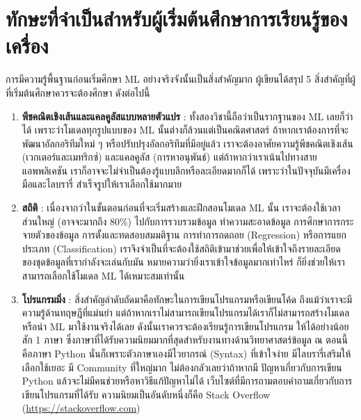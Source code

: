 \section{ทักษะที่จำเป็นสำหรับผู้เริ่มต้นศึกษาการเรียนรู้ของเครื่อง}
\label{sec:skills_for_ml}

การมีความรู้พื้นฐานก่อนเริ่มศึกษา ML อย่างจริงจังนั้นเป็นสิ่งสำคัญมาก ผู้เขียนได้สรุป 5 สิ่งสำคัญที่ผู้ที่เริ่มต้นศึกษาควรจะต้องศึกษา ดังต่อไปนี้

\begin{enumerate}
    \item \textbf{พีชคณิตเชิงเส้นและแคลคูลัสแบบหลายตัวแปร} : ทั้งสองวิชานี้ถือว่าเป็นรากฐานของ ML เลยก็ว่าได้ 
    เพราะว่าโมเดลทุกรูปแบบของ ML นั้นต่างก็ล้วนแต่เป็นคณิตศาสตร์ ถ้าหากเราต้องการที่จะพัฒนาอัลกอริทึมใหม่ ๆ 
    หรือปรับปรุงอัลกอริทึมที่มีอยู่แล้ว เราจะต้องอาศัยความรู้พีชคณิตเชิงเส้น (เวกเตอร์และเมทริกซ์) และแคลคูลัส (การหาอนุพันธ์) 
    แต่ถ้าหากว่าเราเน้นไปทางสายแอพพลิเคชัน เราก็อาจจะไม่จำเป็นต้องรู้แบบลึกหรือละเอียดมากก็ได้ เพราะว่าในปัจจุบันมีเครื่องมือและไลบรารี่%
    สำเร็จรูปให้เราเลือกใช้มากมาย
    
    \item \textbf{สถิติ} : เนื่องจากว่าในขั้นตอนก่อนที่จะเริ่มสร้างและฝึกสอนโมเดล ML นั้น เราจะต้องใช้เวลาส่วนใหญ่ 
    (อาจจะมากถึง 80\%) ไปกับการรวบรวมข้อมูล ทำความสะอาดข้อมูล การศึกษาการกระจายตัวของข้อมูล การตั้งและทดสอบสมมติฐาน 
    การทำการถดถอย (Regression) หรือการแยกประเภท (Classification) เราจึงจำเป็นที่จะต้องใช้สถิติเข้ามาช่วยเพื่อให้เข้าใจถึงรายละเอียด
    ของชุดข้อมูลที่เรากำลังจะเล่นกับมัน หมายความว่ายิ่งเราเข้าใจข้อมูลมากเท่าไหร่ ก็ยิ่งช่วยให้เราสามารถเลือกใช้โมเดล ML ได้เหมาะสมเท่านั้น 
    
    \item \textbf{โปรแกรมมิ่ง} : สิ่งสำคัญลำดับถัดมาคือทักษะในการเขียนโปรแกรมหรือเขียนโค้ด ถึงแม้ว่าเราจะมีความรู้ด้านทฤษฎีที่แม่นยำ 
    แต่ถ้าหากเราไม่สามารถเขียนโปรแกรมได้เราก็ไม่สามารถสร้างโมเดลหรือนำ ML มาใช้งานจริงได้เลย ดังนั้นเราควรจะต้องเรียนรู้การเขียนโปรแกรม
    ให้ได้อย่างน้อยสัก 1 ภาษา ซึ่งภาษาที่ได้รับความนิยมมากที่สุดสำหรับงานทางด้านวิทยาศาสตร์ข้อมูล ณ ตอนนี้คือภาษา Python 
    นั่นก็เพราะตัวภาษาเองมีไวยากรณ์ (Syntax) ที่เข้าใจง่าย มีไลบรารี่เสริมให้เลือกใช้เยอะ มี Community ที่ใหญ่มาก ไม่ต้องกลัวเลยว่าถ้าหากมี%
    ปัญหาเกี่ยวกับการเขียน Python แล้วจะไม่มีคนช่วยหรือหาวิธีแก้ปัญหาไม่ได้ เว็บไซต์ที่มีการถามตอบคำถามเกี่ยวกับการเขียนโปรแกรมที่ได้รับ%
    ความนิยมเป็นอันดับหนึ่งก็คือ Stack Overflow (\url{https://stackoverflow.com})
    

\end{enumerate}
